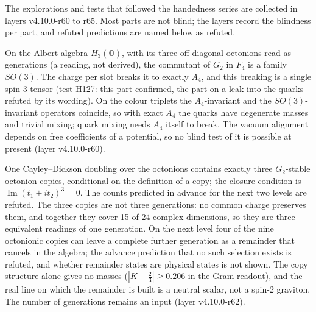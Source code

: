The explorations and tests that followed the handedness series are
collected in layers v4.10.0-r60 to r65. Most parts are not blind; the
layers record the blindness per part, and refuted predictions are
named below as refuted.

On the Albert algebra $H_3(\mathbb O)$, with its three off-diagonal
octonions read as generations (a reading, not derived), the commutant
of $G_2$ in $F_4$ is a family $SO(3)$. The charge per slot breaks it to
exactly $A_4$, and this breaking is a single spin-3 tensor (test H127:
this part confirmed, the part on a leak into the quarks refuted by its
wording). On the colour triplets the $A_4$-invariant and the
$SO(3)$-invariant operators coincide, so with exact $A_4$ the quarks
have degenerate masses and trivial mixing; quark mixing needs $A_4$
itself to break. The vacuum alignment depends on free coefficients of a
potential, so no blind test of it is possible at present
(layer v4.10.0-r60).

One Cayley--Dickson doubling over the octonions contains exactly three
$G_2$-stable octonion copies, conditional on the definition of a copy;
the closure condition is $\operatorname{Im}(t_1+it_2)^3=0$. The counts
predicted in advance for the next two levels are refuted. The three
copies are not three generations: no common charge preserves them, and
together they cover 15 of 24 complex dimensions, so they are three
equivalent readings of one generation. On the next level four of the
nine octonionic copies can leave a complete further generation as a
remainder that cancels in the algebra; the advance prediction that no
such selection exists is refuted, and whether remainder states are
physical states is not shown. The copy structure alone gives no masses
($|K-\tfrac23|\geq0.206$ in the Gram readout), and the real line on
which the remainder is built is a neutral scalar, not a spin-2
graviton. The number of generations remains an input
(layer v4.10.0-r62).

